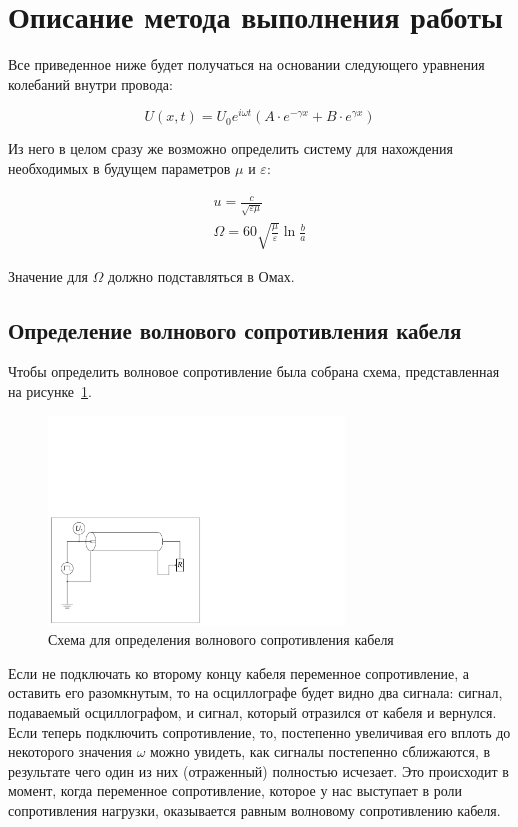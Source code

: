 \documentclass[a4paper, 12pt]{article}
\begin{document}
\section{Описание метода выполнения работы}

Все приведенное ниже будет получаться на основании следующего уравнения колебаний внутри провода:

\begin{equation*}
	U(x, t)=U_{0} e^{i \omega t}\left(A \cdot e^{-\gamma x}+B \cdot e^{\gamma x}\right)
\end{equation*}

Из него в целом сразу же возможно определить систему для нахождения необходимых в будущем параметров $\mu$ и $\varepsilon$:

\begin{eqnarray}
	u=\frac{c}{\sqrt{\varepsilon \mu}}\\
	\label{eq:eqnarray_1}
	\Omega=60 \sqrt{\frac{\mu}{\varepsilon}} \ln \frac{b}{a}
	\label{eq:eqnarray_2}
\end{eqnarray}

Значение для $\Omega$ должно подставляться в Омах.


\subsection{Определение волнового сопротивления кабеля}

Чтобы определить волновое сопротивление была собрана схема, представленная на рисунке~\ref{fig:circuit_wave_r}.

\begin{figure}[H]
	\centering
	\includegraphics[width=0.7\textwidth]{Long_lines_circuit_1}
	\caption{Схема для определения волнового сопротивления кабеля}
	\label{fig:circuit_wave_r}
\end{figure}

Если не подключать ко второму концу кабеля переменное сопротивление, а оставить его разомкнутым, то на осциллографе будет видно два сигнала: сигнал, подаваемый осциллографом, и сигнал, который отразился от кабеля и вернулся. Если теперь подключить сопротивление, то, постепенно увеличивая его вплоть до некоторого значения $\omega$ можно увидеть, как сигналы постепенно сближаются, в результате чего один из них (отраженный) полностью исчезает. Это происходит в момент, когда переменное сопротивление, которое у нас выступает в роли сопротивления нагрузки, оказывается равным волновому сопротивлению кабеля.
\end{document}
